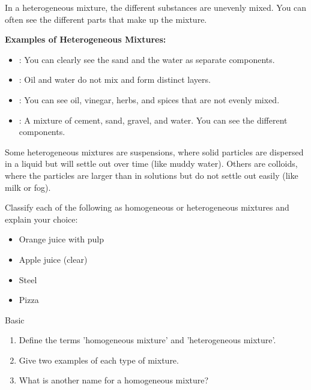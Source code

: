 In a heterogeneous mixture, the different substances are unevenly mixed. You can often see the different parts that make up the mixture.

\begin{example}
\textbf{Examples of Heterogeneous Mixtures:}
\begin{itemize}
    \item {}: You can clearly see the sand and the water as separate components.
    \item {}: Oil and water do not mix and form distinct layers.
    \item {}: You can see oil, vinegar, herbs, and spices that are not evenly mixed.
    \item {}: A mixture of cement, sand, gravel, and water. You can see the different components.
\end{itemize}
\end{example}


Some heterogeneous mixtures are suspensions, where solid particles are dispersed in a liquid but will settle out over time (like muddy water). Others are colloids, where the particles are larger than in solutions but do not settle out easily (like milk or fog).

\begin{stopandthink}
Classify each of the following as homogeneous or heterogeneous mixtures and explain your choice:
\begin{itemize}
    \item Orange juice with pulp
    \item Apple juice (clear)
    \item Steel
    \item Pizza
\end{itemize}
\end{stopandthink}

\begin{tieredquestions}{Basic}
\begin{enumerate}
    \item Define the terms 'homogeneous mixture' and 'heterogeneous mixture'.
    \item Give two examples of each type of mixture.
    \item What is another name for a homogeneous mixture?
\end{enumerate}
\end{tieredquestions}

